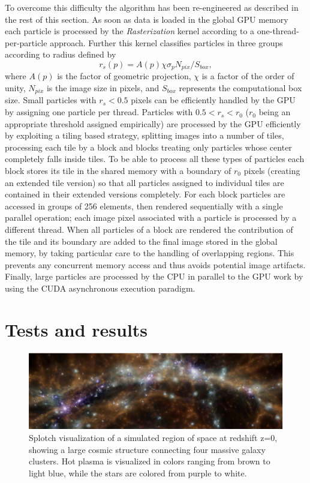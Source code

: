 \documentclass[11pt,twoside]{article}
\begin{document}
To overcome this difficulty the algorithm has been re-engineered
as described in the rest of this section. As soon as data is loaded in the global GPU memory each particle is processed by the {\it Rasterization} kernel according to a one-thread-per-particle approach. Further this kernel classifies 
particles in three groups according to radius defined by
\begin{equation}\label{rad2}{r_s(p)}=A(p)\chi \sigma_p N_{pix}/ S_{box},
\end{equation}
where $A(p)$ is the factor of geometric projection, $\chi$ is a factor of the order of unity, $N_{pix}$ is the image size in pixels, and $S_{box}$ represents the computational box size. Small particles with $r_s < 0.5$ pixels can be efficiently handled by the GPU by assigning one particle per thread. Particles with $0.5<r_s<r_0$ ($r_0$ being an appropriate threshold assigned empirically) are processed by the GPU efficiently by exploiting a tiling based strategy, splitting images into a number of tiles, processing each tile by a block and blocks treating only particles whose center completely falls inside tiles. To be able to process all these types of particles each block stores its tile in the shared memory with a boundary of $r_0$ pixels (creating an extended tile version) so that all particles assigned to individual tiles are contained in their extended versions completely. For each block particles are accessed in groups of 256 elements, then rendered sequentially with a single parallel operation; each image pixel associated with a particle is processed by a different thread. When all particles of a block are rendered the contribution of the tile and its boundary are added to the final image stored in the global memory, by taking particular care to the handling of overlapping regions. This prevents any concurrent memory access and thus avoids potential image artifacts. Finally, large particles are processed by the CPU in parallel 
to the GPU work by using the CUDA asynchronous execution paradigm.

\section{Tests and results}

\begin{figure}
\centering
\includegraphics[scale=1.0]{P013-1.eps}
\caption{Splotch visualization of a simulated region of space at redshift z=0, 
showing a large cosmic structure connecting four massive galaxy clusters. 
Hot plasma is visualized in colors ranging from brown to light blue, 
while the stars are colored from purple to white. 
}

\label{fig:box}
\end{figure}
\end{document}
